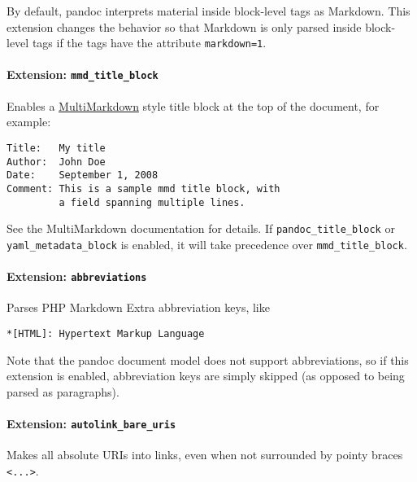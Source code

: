 \documentclass[
]{article}
\begin{document}
By default, pandoc interprets material inside block-level tags as
Markdown. This extension changes the behavior so that Markdown is only
parsed inside block-level tags if the tags have the attribute
\texttt{markdown=1}.

\paragraph{\texorpdfstring{Extension:
\texttt{mmd\_title\_block}}{Extension: mmd\_title\_block}}\label{extension-mmd_title_block}

Enables a
\href{https://fletcherpenney.net/multimarkdown/}{MultiMarkdown} style
title block at the top of the document, for example:

\begin{verbatim}
Title:   My title
Author:  John Doe
Date:    September 1, 2008
Comment: This is a sample mmd title block, with
         a field spanning multiple lines.
\end{verbatim}

See the MultiMarkdown documentation for details. If
\texttt{pandoc\_title\_block} or \texttt{yaml\_metadata\_block} is
enabled, it will take precedence over \texttt{mmd\_title\_block}.

\paragraph{\texorpdfstring{Extension:
\texttt{abbreviations}}{Extension: abbreviations}}\label{extension-abbreviations}

Parses PHP Markdown Extra abbreviation keys, like

\begin{verbatim}
*[HTML]: Hypertext Markup Language
\end{verbatim}

Note that the pandoc document model does not support abbreviations, so
if this extension is enabled, abbreviation keys are simply skipped (as
opposed to being parsed as paragraphs).

\paragraph{\texorpdfstring{Extension:
\texttt{autolink\_bare\_uris}}{Extension: autolink\_bare\_uris}}\label{extension-autolink_bare_uris}

Makes all absolute URIs into links, even when not surrounded by pointy
braces \texttt{\textless{}...\textgreater{}}.
\end{document}
